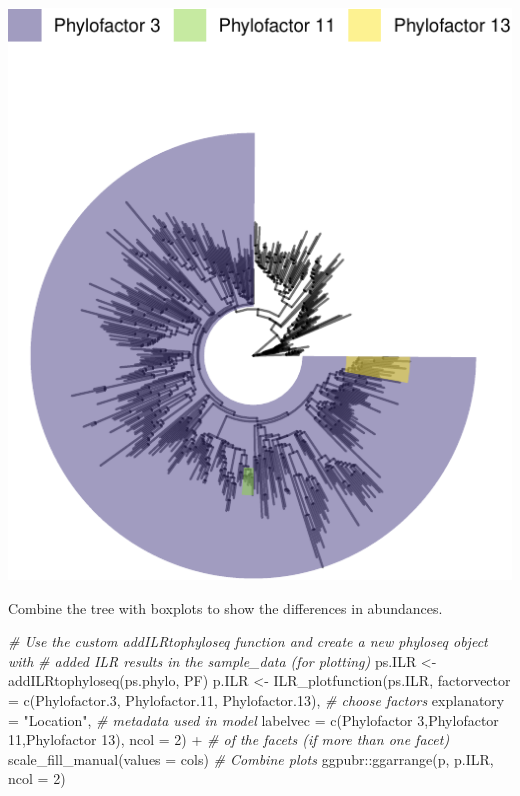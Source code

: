 \documentclass[
]{book}
\newenvironment{Shaded}{\begin{snugshade}}{\end{snugshade}}
\newcommand{\AttributeTok}[1]{\textcolor[rgb]{0.77,0.63,0.00}{#1}}
\newcommand{\CommentTok}[1]{\textcolor[rgb]{0.56,0.35,0.01}{\textit{#1}}}
\newcommand{\DecValTok}[1]{\textcolor[rgb]{0.00,0.00,0.81}{#1}}
\newcommand{\FunctionTok}[1]{\textcolor[rgb]{0.00,0.00,0.00}{#1}}
\newcommand{\NormalTok}[1]{#1}
\newcommand{\OtherTok}[1]{\textcolor[rgb]{0.56,0.35,0.01}{#1}}
\newcommand{\SpecialCharTok}[1]{\textcolor[rgb]{0.00,0.00,0.00}{#1}}
\newcommand{\StringTok}[1]{\textcolor[rgb]{0.31,0.60,0.02}{#1}}
\begin{document}
\includegraphics{gitbook-demo_files/figure-latex/colouredtree4-1.pdf}

Combine the tree with boxplots to show the differences in abundances.

\begin{Shaded}
\begin{Highlighting}[]
\CommentTok{\# Use the custom addILRtophyloseq function and create a new phyloseq object with }
\CommentTok{\# added ILR results in the sample\_data (for plotting)}
\NormalTok{ps.ILR }\OtherTok{\textless{}{-}} \FunctionTok{addILRtophyloseq}\NormalTok{(ps.phylo, PF)}
\NormalTok{p.ILR }\OtherTok{\textless{}{-}} \FunctionTok{ILR\_plotfunction}\NormalTok{(ps.ILR,}
                \AttributeTok{factorvector =} \FunctionTok{c}\NormalTok{(}\StringTok{\textquotesingle{}Phylofactor.3\textquotesingle{}}\NormalTok{, }\StringTok{\textquotesingle{}Phylofactor.11\textquotesingle{}}\NormalTok{, }\StringTok{\textquotesingle{}Phylofactor.13\textquotesingle{}}\NormalTok{),  }\CommentTok{\# choose factors }
                \AttributeTok{explanatory =} \StringTok{"Location"}\NormalTok{,  }\CommentTok{\# metadata used in model}
                \AttributeTok{labelvec =} \FunctionTok{c}\NormalTok{(}\StringTok{\textquotesingle{}Phylofactor 3\textquotesingle{}}\NormalTok{,}\StringTok{\textquotesingle{}Phylofactor 11\textquotesingle{}}\NormalTok{,}\StringTok{\textquotesingle{}Phylofactor 13\textquotesingle{}}\NormalTok{),}
                \AttributeTok{ncol =} \DecValTok{2}\NormalTok{)  }\SpecialCharTok{+} \CommentTok{\# of the facets (if more than one facet) }
          \FunctionTok{scale\_fill\_manual}\NormalTok{(}\AttributeTok{values =}\NormalTok{ cols)}
\CommentTok{\# Combine plots}
\NormalTok{ggpubr}\SpecialCharTok{::}\FunctionTok{ggarrange}\NormalTok{(p, p.ILR, }\AttributeTok{ncol =} \DecValTok{2}\NormalTok{)}
\end{Highlighting}
\end{Shaded}
\end{document}
